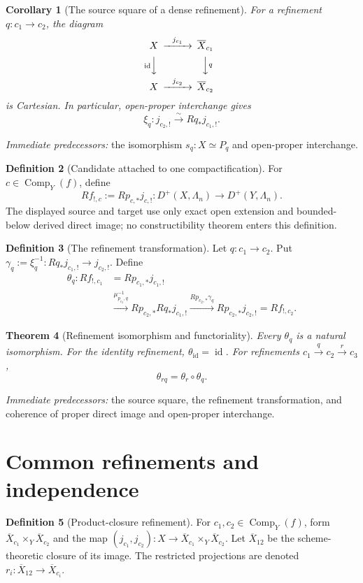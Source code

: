 \documentclass[10pt]{article}
\newtheorem{theorem}{Theorem}[section]
\newtheorem{corollary}[theorem]{Corollary}
\theoremstyle{definition}
\newtheorem{definition}[theorem]{Definition}
\newcommand{\Comp}{\operatorname{Comp}}
\newcommand{\pred}[1]{\par\smallskip\begingroup\footnotesize\raggedright
\emph{Immediate predecessors:} #1.\par\endgroup}
\begin{document}
\begin{corollary}[The source square of a dense refinement]
For a refinement \(q:c_1\to c_2\), the diagram
\[
\begin{CD}
 X@>{j_{c_1}}>>\overline X_{c_1}\\
 @V{\operatorname{id}}VV @VV{q}V\\
 X@>{j_{c_2}}>>\overline X_{c_2}
\end{CD}
\]
is Cartesian.  In particular, open-proper interchange gives
\[
 \xi_q:j_{c_2,!}\xrightarrow{\sim}Rq_*j_{c_1,!}.
\]
\end{corollary}
\pred{the isomorphism \(s_q:X\simeq P_q\) and open-proper interchange}

\begin{definition}[Candidate attached to one compactification]
For \(c\in\Comp_Y(f)\), define
\[
 Rf_{!,c}:=Rp_{c,*}j_{c,!}:
 D^+(X,\Lambda_n)\longrightarrow D^+(Y,\Lambda_n).
\]
The displayed source and target use only exact open extension and
bounded-below derived direct image; no constructibility theorem enters this
definition.
\end{definition}

\begin{definition}[The refinement transformation]
Let \(q:c_1\to c_2\).  Put
\(\gamma_q:=\xi_q^{-1}:Rq_*j_{c_1,!}\to j_{c_2,!}\).  Define
\[
 \begin{aligned}
 \theta_q:Rf_{!,c_1}
 &=Rp_{c_1,*}j_{c_1,!}\\
 &\xrightarrow{\mu_{p_{c_2},q}^{-1}}
 Rp_{c_2,*}Rq_*j_{c_1,!}
 \xrightarrow{Rp_{c_2,*}\gamma_q}
 Rp_{c_2,*}j_{c_2,!}=Rf_{!,c_2}.
 \end{aligned}
\]
\end{definition}

\begin{theorem}[Refinement isomorphism and functoriality]
Every \(\theta_q\) is a natural isomorphism.  For the identity refinement,
\(\theta_{\operatorname{id}}=\operatorname{id}\).  For refinements
\(c_1\xrightarrow{q}c_2\xrightarrow{r}c_3\),
\[
 \theta_{rq}=\theta_r\circ\theta_q.
\]
\end{theorem}
\pred{the source square, the refinement transformation, and coherence of proper direct image and open-proper interchange}

\section{Common refinements and independence}

\begin{definition}[Product-closure refinement]
For \(c_1,c_2\in\Comp_Y(f)\), form
\(\overline X_{c_1}\times_Y\overline X_{c_2}\) and the map
\((j_{c_1},j_{c_2}):X\to
\overline X_{c_1}\times_Y\overline X_{c_2}\).  Let
\(\overline X_{12}\) be the scheme-theoretic closure of its image.  The
restricted projections are denoted
\(r_i:\overline X_{12}\to\overline X_{c_i}\).
\end{definition}
\end{document}
